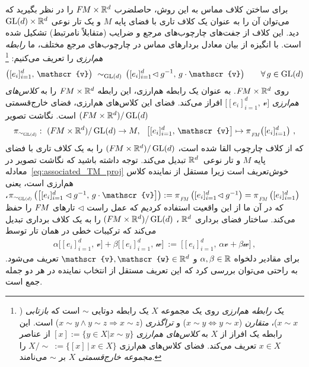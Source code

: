 برای ساختن کلاف مماس به این روش، حاصلضرب $F\mkern-1.5muM\times\mathbb{R}^d$ را در نظر بگیرید که می‌توان آن را به عنوان یک کلاف تاری با فضای پایه $M$ و یک تار نوعی $\operatorname{GL}(d)\times\mathbb{R}^d$ دید.
این کلاف از جفت‌های چارچوب‌های مرجع و ضرایب (متقابلاً نامرتبط) تشکیل شده است.
با انگیزه از بیان معادل بردارهای مماس در چارچوب‌های مرجع مختلف، ما \emph{رابطه هم‌ارزی} را تعریف می‌کنیم:%
\footnote{\label{footnote:equiv_rel}%
	یک \emph{رابطه هم‌ارزی} روی یک مجموعه $X$ یک رابطه دوتایی $\sim$ است که
	\emph{بازتابی} ($x\!\sim\! x$)،
	\emph{متقارن} ($x\!\sim\! y \Leftrightarrow y\!\sim\! x$) و
	\emph{تراگذری} ($x\!\sim\! y \wedge y\!\sim\! z \Rightarrow x\!\sim\! z$) است.
	این رابطه یک افراز از $X$ به \emph{کلاس‌های هم‌ارزی} $[x] := \{y\in X | x\sim y\}$ از عناصر $x\in X$ تعریف می‌کند.
	فضای کلاس‌های هم‌ارزی $X/\!\!\sim\ := \{[x] \,|\, x\in X\}$ را \emph{مجموعه خارج‌قسمتی} $X$ بر $\sim$ می‌نامند.
}
\begin{align}\label{eq:equiv_relation_TM}
	\big([e_i]_{i=1}^d,\,\mathscr{v}\big)\ \sim_{\GL{d}}\, \big([e_i]_{i=1}^d\!\lhd g^{-1},\, g\cdot \mathscr{v}\big) \qquad\forall\, g\in \GL{d}
\end{align}
روی $F\mkern-1.5muM\times\mathbb{R}^d$.
به عنوان یک رابطه هم‌ارزی، این رابطه $F\mkern-1.5muM\times\mathbb{R}^d$ را به \emph{کلاس‌های هم‌ارزی} $\big[[e_i]_{i=1}^d,\,\mathscr{v}\big]$ افراز می‌کند.
فضای این کلاس‌های هم‌ارزی، فضای خارج‌قسمتی $(F\mkern-1.5muM\times\mathbb{R}^d)/\operatorname{GL}(d)$ است.
نگاشت تصویر
\begin{align}\label{eq:associated_TM_proj}
	\pi_{\scalebox{.75}{$\sim_{\GL{d}}$}}:\ 
	(\FM\times\R^d)/\GL{d} \to M,\ \ 
	\big[[e_i]_{i=1}^d,\,\mathscr{v}\big] \mapsto \piFM\!\left([e_i]_{i=1}^d\right) \,,
\end{align}
که از کلاف چارچوب القا شده است، $(F\mkern-1.5muM\times\mathbb{R}^d)/\operatorname{GL}(d)$ را به یک کلاف تاری با فضای پایه $M$ و تار نوعی~$\mathbb{R}^d$ تبدیل می‌کند.
توجه داشته باشید که نگاشت تصویر در معادله~\eqref{eq:associated_TM_proj} خوش‌تعریف است زیرا مستقل از نماینده کلاس هم‌ارزی است، یعنی
$\pi_{\scalebox{.75}{$\sim_{\GL{d}}$}}\left(\big[[e_i]_{i=1}^d\lhd g^{-1},\, g\cdot \mathscr{v}\big]\right) := \piFM\left([e_i]_{i=1}^d\!\lhd g^{-1}\right) = \piFM\left([e_i]_{i=1}^d\right)$،
که در آن ما از این واقعیت استفاده کردیم که عمل راست $\lhd$ تارهای $F\mkern-1.5muM$ را حفظ می‌کند.
ساختار فضای برداری $\mathbb{R}^d$ ، $(F\mkern-1.5muM\times\mathbb{R}^d)/\operatorname{GL}(d)$ را به یک کلاف برداری تبدیل می‌کند که ترکیبات خطی در همان تار توسط
\begin{align}\label{eq:associated_bdl_linear_combination}
	\alpha \big[[e_i]_{i=1}^d,\,\mathscr{v}\big] + \beta \big[[e_i]_{i=1}^d,\,\mathscr{w}\big]
	\ :=\ \big[[e_i]_{i=1}^d,\,\alpha\mathscr{v} + \beta\mathscr{w} \big] \,,
\end{align}
برای مقادیر دلخواه $\alpha,\beta\in\mathbb{R}$ و $\mathscr{v},\mathscr{w}\in\R^d$ تعریف می‌شود.
به راحتی می‌توان بررسی کرد که این تعریف مستقل از انتخاب نماینده در هر دو جمله جمع است.

